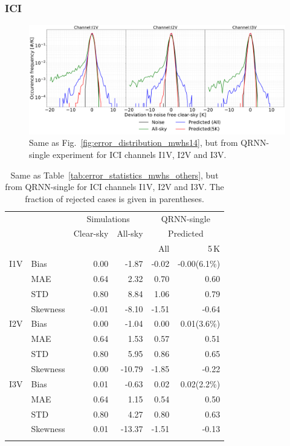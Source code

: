 \documentclass[amt, manuscript]{copernicus}
\begin{document}
\subsubsection{ICI}
%
\begin{figure}[t]
	\includegraphics[width=\textwidth]{Figures/error_distribution_QRNN-single.pdf} 
	\caption{Same as Fig.~\ref{fig:error_distribution_mwhs14}, but from QRNN-single experiment for ICI channels I1V, I2V and I3V. }
	\label{fig:error_distributions}	
\end{figure}
\begin{table}[t]
	\caption{ Same as Table~\ref{tab:error_statistics_mwhs_others}, but from QRNN-single for ICI channels I1V, I2V and I3V. The fraction of rejected cases is given in parentheses.}
	\label{tab:error_statistics_ici}
	\begin{tabular}{llrr|rr}
		\tophline
		&&\multicolumn{2}{c|}{Simulations}& \multicolumn{2}{c}{QRNN-single} \\
		\cline{3-6}
		&&Clear-sky &   All-sky &  \multicolumn{2}{c}{Predicted}  \\
		&&			   &			&	All & 5\,K \\
		\middlehline
		
		I1V&  Bias      &  0.00 & -1.87 & -0.02 & -0.00(6.1\%)  \\
		&MAE       		&  0.64 &  2.32 &  0.70 &  0.60   \\
		&STD       		&  0.80 &  8.84 &  1.06 &  0.79   \\
		&Skewness 		& -0.01 & -8.10 & -1.51 & -0.64  \\
		\middlehline
		I2V & Bias      & 0.00 &  -1.04 &  0.00 &  0.01(3.6\%)  \\
		&MAE       		& 0.64 &   1.53 &  0.57 &  0.51 \\
		&STD       		& 0.80 &   5.95 &  0.86 &  0.65 \\
		&Skewness 		& 0.00 & -10.79 & -1.85 & -0.22  \\
		\middlehline	
		I3V & Bias      & 0.01 &  -0.63 &  0.02 &  0.02(2.2\%)  \\
		&MAE       		& 0.64 &   1.15 &  0.54 &  0.50  \\
		&STD       		& 0.80 &   4.27 &  0.80 &  0.63  \\
		&Skewness 		& 0.01 & -13.37 & -1.51 & -0.13  \\
		\bottomhline
	\end{tabular}
	\belowtable{} %
\end{table}
\end{document}
